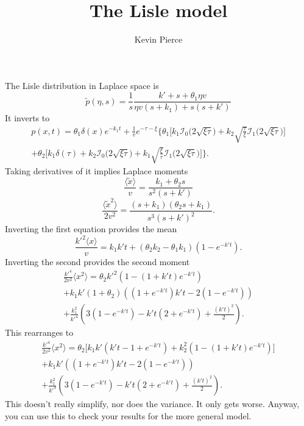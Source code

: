 \documentclass[11pt]{article}
\newcommand\be{\begin{equation}} %
\newcommand\ee{\end{equation}}   %
\newcommand\bra{\langle}
\newcommand\ket{\rangle}
\newcommand\tp{\tilde{p}}
\begin{document}
\title{The Lisle model}
\author{Kevin Pierce}
\maketitle

The Lisle distribution in Laplace space is 
\be \tp(\eta,s) = \frac{1}{s} \frac{k'+s + \theta_1\eta v}{\eta v(s+k_1) + s(s+k')} \ee
It inverts to 
\begin{multline} p(x,t) = \theta_1\delta(x) e^{-k_1t}+\frac{1}{v}e^{-\tau-\xi}\Big\{\theta_1\Big[k_1 \mathcal{I}_0\Big(2\sqrt{\xi\tau}\Big) + k_2\sqrt{\frac{\tau}{\xi}}\mathcal{I}_1\Big(2\sqrt{\xi\tau}\Big)\Big] \\
+ \theta_2\Big[k_1\delta(\tau) + k_2 \mathcal{I}_0\Big(2\sqrt{\xi\tau}\Big) + k_1\sqrt{\frac{\xi}{\tau}}\mathcal{I}_1\Big(2\sqrt{\xi\tau}\Big)\Big] \Big\}.
\end{multline}
Taking derivatives of it implies Laplace moments
\be \frac{\bra \tilde{x}\ket}{v} = \frac{k_1 + \theta_2 s}{s^2(s+k')}\ee 
\be \frac{\bra \tilde{x}^2\ket}{2v^2} = \frac{(s+k_1)(\theta_2 s+k_1)}{s^3(s+k')^2}.\ee 
Inverting the first equation provides the mean 
\be \frac{k'^2 \bra x \ket}{v} = k_1 k' t + (\theta_2 k_2 - \theta_1 k_1)(1-e^{-k't}).\ee
Inverting the second provides the second moment
\begin{multline}
\frac{k'^4}{2v^2}\bra x^2 \ket = \theta_2 k'^2(1-(1+k't)e^{-k't}) \\ + k_1k'(1+\theta_2)((1+e^{-k't})k't-2(1-e^{-k't})) \\+ \frac{k_1^2}{k'^4}(3(1-e^{-k't})-k't(2+e^{-k't})+\frac{(k't)^2}{2}).
\end{multline}
This rearranges to 
\begin{multline}
\frac{k'^4}{2v^2}\bra x^2 \ket 
= \theta_2 \Big[k_1k'(k't-1+e^{-k't}) + k_2^2(1-(1+k't)e^{-k't})\Big] \\
+ k_1k'((1+e^{-k't})k't-2(1-e^{-k't})) \\+ \frac{k_1^2}{k'^4}(3(1-e^{-k't})-k't(2+e^{-k't})+\frac{(k't)^2}{2}).
\end{multline}
This doesn't really simplify, nor does the variance. It only gets worse. Anyway, you can use this to check your results for the more general model.

\end{document}
